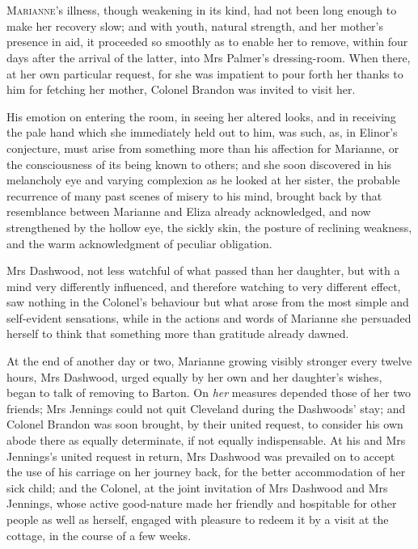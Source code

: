 \chapter[Chapter \thechapter]{}
\lettrine[lraise=0.3]{M}{arianne}'s illness, though weakening in its kind, had not been long enough to make her recovery slow; and with youth, natural strength, and her mother's presence in aid, it proceeded so smoothly as to enable her to remove, within four days after the arrival of the latter, into Mrs Palmer's dressing-room. When there, at her own particular request, for she was impatient to pour forth her thanks to him for fetching her mother, Colonel Brandon was invited to visit her.

His emotion on entering the room, in seeing her altered looks, and in receiving the pale hand which she immediately held out to him, was such, as, in Elinor's conjecture, must arise from something more than his affection for Marianne, or the consciousness of its being known to others; and she soon discovered in his melancholy eye and varying complexion as he looked at her sister, the probable recurrence of many past scenes of misery to his mind, brought back by that resemblance between Marianne and Eliza already acknowledged, and now strengthened by the hollow eye, the sickly skin, the posture of reclining weakness, and the warm acknowledgment of peculiar obligation.

Mrs Dashwood, not less watchful of what passed than her daughter, but with a mind very differently influenced, and therefore watching to very different effect, saw nothing in the Colonel's behaviour but what arose from the most simple and self-evident sensations, while in the actions and words of Marianne she persuaded herself to think that something more than gratitude already dawned.

At the end of another day or two, Marianne growing visibly stronger every twelve hours, Mrs Dashwood, urged equally by her own and her daughter's wishes, began to talk of removing to Barton. On \textit{her} measures depended those of her two friends; Mrs Jennings could not quit Cleveland during the Dashwoods' stay; and Colonel Brandon was soon brought, by their united request, to consider his own abode there as equally determinate, if not equally indispensable. At his and Mrs Jennings's united request in return, Mrs Dashwood was prevailed on to accept the use of his carriage on her journey back, for the better accommodation of her sick child; and the Colonel, at the joint invitation of Mrs Dashwood and Mrs Jennings, whose active good-nature made her friendly and hospitable for other people as well as herself, engaged with pleasure to redeem it by a visit at the cottage, in the course of a few weeks.

